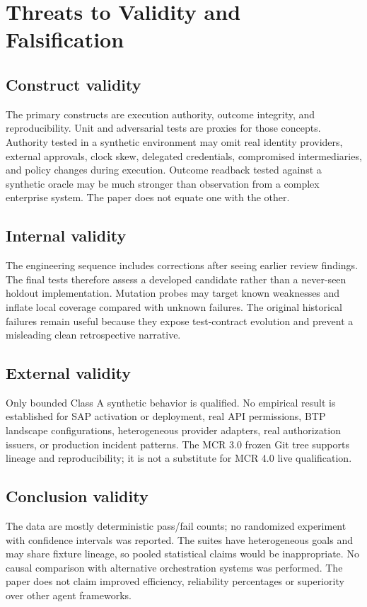 \documentclass[11pt,twocolumn]{article}
\begin{document}
\section{Threats to Validity and Falsification}
\subsection{Construct validity}
The primary constructs are execution authority, outcome integrity, and reproducibility. Unit and adversarial tests are proxies for those concepts. Authority tested in a synthetic environment may omit real identity providers, external approvals, clock skew, delegated credentials, compromised intermediaries, and policy changes during execution. Outcome readback tested against a synthetic oracle may be much stronger than observation from a complex enterprise system. The paper does not equate one with the other.

\subsection{Internal validity}
The engineering sequence includes corrections after seeing earlier review findings. The final tests therefore assess a developed candidate rather than a never-seen holdout implementation. Mutation probes may target known weaknesses and inflate local coverage compared with unknown failures. The original historical failures remain useful because they expose test-contract evolution and prevent a misleading clean retrospective narrative.

\subsection{External validity}
Only bounded Class A synthetic behavior is qualified. No empirical result is established for SAP activation or deployment, real API permissions, BTP landscape configurations, heterogeneous provider adapters, real authorization issuers, or production incident patterns. The MCR 3.0 frozen Git tree supports lineage and reproducibility; it is not a substitute for MCR 4.0 live qualification.

\subsection{Conclusion validity}
The data are mostly deterministic pass/fail counts; no randomized experiment with confidence intervals was reported. The suites have heterogeneous goals and may share fixture lineage, so pooled statistical claims would be inappropriate. No causal comparison with alternative orchestration systems was performed. The paper does not claim improved efficiency, reliability percentages or superiority over other agent frameworks.
\end{document}
